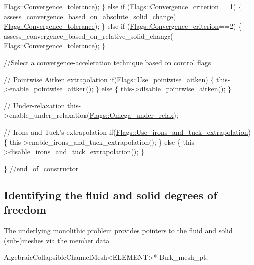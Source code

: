 \begin{DoxyCodeInclude}
    \hyperlink{namespaceFlags_a5550ee43b27fd03898a6718246b44e4a}{Flags::Convergence\_tolerance});
  \}
 \textcolor{keywordflow}{else} \textcolor{keywordflow}{if} (\hyperlink{namespaceFlags_aba930ff1e462e642a27904df95baab7c}{Flags::Convergence\_criterion}==1)
  \{
   assess\_convergence\_based\_on\_absolute\_solid\_change(
    \hyperlink{namespaceFlags_a5550ee43b27fd03898a6718246b44e4a}{Flags::Convergence\_tolerance});
  \}
 \textcolor{keywordflow}{else} \textcolor{keywordflow}{if} (\hyperlink{namespaceFlags_aba930ff1e462e642a27904df95baab7c}{Flags::Convergence\_criterion}==2)
  \{
   assess\_convergence\_based\_on\_relative\_solid\_change(
    \hyperlink{namespaceFlags_a5550ee43b27fd03898a6718246b44e4a}{Flags::Convergence\_tolerance});
  \}
 
 \textcolor{comment}{//Select a convergence-acceleration technique based on control flags}

 \textcolor{comment}{// Pointwise Aitken extrapolation}
 \textcolor{keywordflow}{if}(\hyperlink{namespaceFlags_aabfbfdb3e91e4df3fc2ec6e2a2e3567d}{Flags::Use\_pointwise\_aitken})
  \{
   this->enable\_pointwise\_aitken();
  \}
 \textcolor{keywordflow}{else}
  \{
   this->disable\_pointwise\_aitken();
  \}

 \textcolor{comment}{// Under-relaxation}
 this->enable\_under\_relaxation(\hyperlink{namespaceFlags_a6c3895aecba834ceda5fe1c3ecb13bba}{Flags::Omega\_under\_relax});

 \textcolor{comment}{// Irons and Tuck's extrapolation}
 \textcolor{keywordflow}{if}(\hyperlink{namespaceFlags_a9d92a2ec6ebd4e2ea66605c063e53915}{Flags::Use\_irons\_and\_tuck\_extrapolation})
  \{
   this->enable\_irons\_and\_tuck\_extrapolation();
  \}
 \textcolor{keywordflow}{else}
  \{
   this->disable\_irons\_and\_tuck\_extrapolation();
  \}

\} \textcolor{comment}{//end\_of\_constructor}

\end{DoxyCodeInclude}




\hypertarget{index_identify}{}\subsection{Identifying the fluid and solid degrees of freedom}\label{index_identify}
The underlying monolithic problem provides pointers to the fluid and solid (sub-\/)meshes via the member data 
\begin{DoxyCode}
AlgebraicCollapsibleChannelMesh<ELEMENT>* Bulk\_mesh\_pt;
\end{DoxyCode}
 
